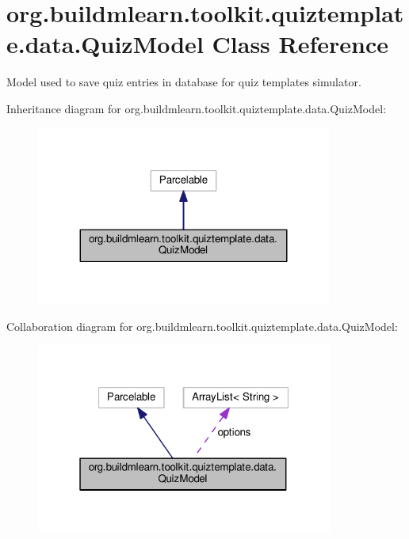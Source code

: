 \hypertarget{classorg_1_1buildmlearn_1_1toolkit_1_1quiztemplate_1_1data_1_1QuizModel}{}\section{org.\+buildmlearn.\+toolkit.\+quiztemplate.\+data.\+Quiz\+Model Class Reference}
\label{classorg_1_1buildmlearn_1_1toolkit_1_1quiztemplate_1_1data_1_1QuizModel}


Model used to save quiz entries in database for quiz template\textquotesingle{}s simulator.  




Inheritance diagram for org.\+buildmlearn.\+toolkit.\+quiztemplate.\+data.\+Quiz\+Model\+:
\nopagebreak
\begin{figure}[H]
\begin{center}
\leavevmode
\includegraphics[width=275pt]{classorg_1_1buildmlearn_1_1toolkit_1_1quiztemplate_1_1data_1_1QuizModel__inherit__graph}
\end{center}
\end{figure}


Collaboration diagram for org.\+buildmlearn.\+toolkit.\+quiztemplate.\+data.\+Quiz\+Model\+:
\nopagebreak
\begin{figure}[H]
\begin{center}
\leavevmode
\includegraphics[width=277pt]{classorg_1_1buildmlearn_1_1toolkit_1_1quiztemplate_1_1data_1_1QuizModel__coll__graph}
\end{center}
\end{figure}
